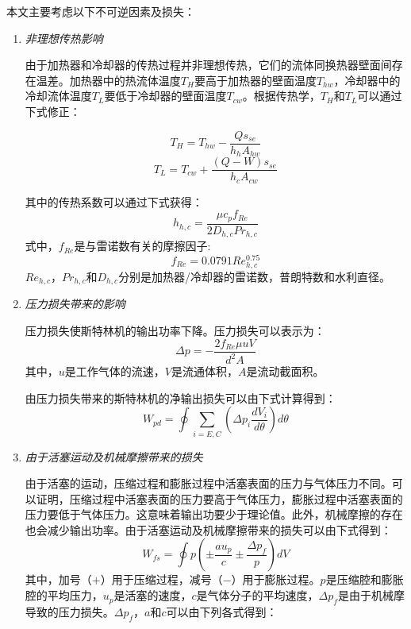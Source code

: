 本文主要考虑以下不可逆因素及损失：
\begin{enumerate}[label=(\arabic*)]
\item \emph{非理想传热影响}

由于加热器和冷却器的传热过程并非理想传热，它们的流体同换热器壁面间存在温差。加热器中的热流体温度$T_{H}$要高于加热器的壁面温度$T_{hw}$，冷却器中的冷却流体温度$T_L$要低于冷却器的壁面温度$T_{cw}$。根据传热学，$T_{H}$和$T_{L}$可以通过下式修正：

\begin{equation}
	T_H = T_{hw} - \frac{Qs_{se}}{h_hA_{hw}}
	\label{eq:T_H}
\end{equation}
\begin{equation}
	T_L = T_{cw} + \frac{(Q-W)s_{se}}{h_cA_{cw}}
	\label{eq:T_L}
\end{equation}

其中的传热系数可以通过下式获得\cite{Babaelahi2015}：
\begin{equation}
	h_{h,c} = \frac{\mu c_pf_{Re}}{2D_{h,c}Pr_{h,c}}
\end{equation}
式中，$f_{Re}$是与雷诺数有关的摩擦因子:
\begin{equation}
	f_{Re} = 0.0791Re_{h,c}^{0.75}
\end{equation}
$Re_{h,c}$，$Pr_{h,c}$和$D_{h,c}$分别是加热器/冷却器的雷诺数，普朗特数和水利直径。

\item \emph{压力损失带来的影响}

压力损失使斯特林机的输出功率下降。压力损失可以表示为\cite{Urieli1984}：
\begin{equation}
	\Delta p = -\frac{2f_{Re}\mu u V}{d^2A}
\end{equation}
其中，$u$是工作气体的流速，$V$是流通体积，$A$是流动截面积。

由压力损失带来的斯特林机的净输出损失可以由下式计算得到：
\begin{equation}
	W_{pd} = \oint\underset{i = E,C}{\sum}(\Delta p_{i}\frac{dV_i}{d\theta})d\theta
\end{equation}

\item \emph{由于活塞运动及机械摩擦带来的损失}

由于活塞的运动，压缩过程和膨胀过程中活塞表面的压力与气体压力不同。可以证明，压缩过程中活塞表面的压力要高于气体压力，膨胀过程中活塞表面的压力要低于气体压力。这意味着输出功要少于理论值。此外，机械摩擦的存在也会减少输出功率。由于活塞运动及机械摩擦带来的损失可以由下式得到\cite{Babaelahi2015}：
\begin{equation}
	W_{fs} = \oint p(\pm\frac{au_p}{c}\pm\frac{\Delta p_f}{p})dV
\end{equation}
其中，加号（$+$）用于压缩过程，减号（$-$）用于膨胀过程。$p$是压缩腔和膨胀腔的平均压力，$u_p$是活塞的速度，$c$是气体分子的平均速度，$\Delta p_f$是由于机械摩导致的压力损失。$\Delta p_f$，$a$和$c$可以由下列各式得到\cite{Heywood1988}：


\end{enumerate}
